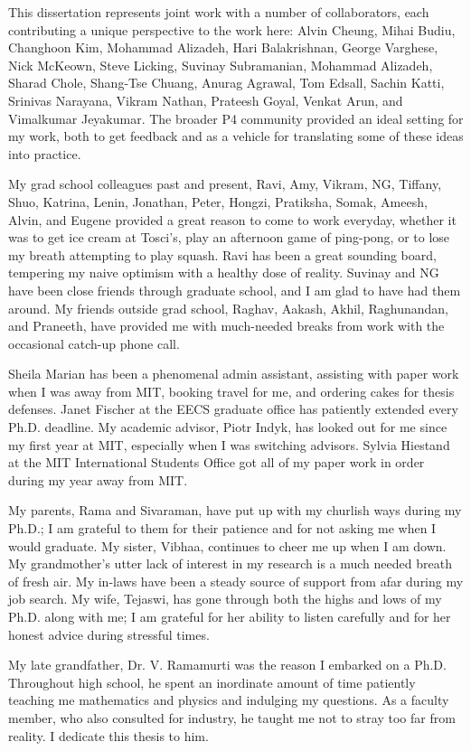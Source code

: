 This dissertation represents joint work with a number of collaborators, each
contributing a unique perspective to the work here: Alvin Cheung, Mihai Budiu,
Changhoon Kim, Mohammad Alizadeh, Hari Balakrishnan, George Varghese, Nick
McKeown, Steve Licking, Suvinay Subramanian, Mohammad Alizadeh, Sharad Chole,
Shang-Tse Chuang, Anurag Agrawal, Tom Edsall, Sachin Katti, Srinivas Narayana,
Vikram Nathan, Prateesh Goyal, Venkat Arun, and Vimalkumar Jeyakumar. The
broader P4 community provided an ideal setting for my work, both to get
feedback and as a vehicle for translating some of these ideas into practice. 

My grad school colleagues past and present, Ravi, Amy, Vikram, NG, Tiffany,
Shuo, Katrina, Lenin, Jonathan, Peter, Hongzi, Pratiksha, Somak, Ameesh, Alvin,
and Eugene provided a great reason to come to work everyday, whether it was to
get ice cream at Tosci's, play an afternoon game of ping-pong, or to lose my
breath attempting to play squash. Ravi has been a great sounding board,
tempering my naive optimism with a healthy dose of reality. Suvinay and NG have
been close friends through graduate school, and I am glad to have had them
around. My friends outside grad school, Raghav, Aakash, Akhil, Raghunandan, and
Praneeth, have provided me with much-needed breaks from work with the
occasional catch-up phone call.

Sheila Marian has been a phenomenal admin assistant, assisting with paper work
when I was away from MIT, booking travel for me, and ordering cakes for thesis
defenses. Janet Fischer at the EECS graduate office has patiently extended
every Ph.D.  deadline. My academic advisor, Piotr Indyk, has looked out for me
since my first year at MIT, especially when I was switching advisors.  Sylvia
Hiestand at the MIT International Students Office got all of my paper work in
order during my year away from MIT.

My parents, Rama and Sivaraman, have put up with my churlish ways during my
Ph.D.; I am grateful to them for their patience and for not asking me when I
would graduate. My sister, Vibhaa, continues to cheer me up when I am down.  My
grandmother's utter lack of interest in my research is a much needed breath of
fresh air. My in-laws have been a steady source of support from afar during my
job search. My wife, Tejaswi, has gone through both the highs and lows of my
Ph.D. along with me; I am grateful for her ability to listen carefully and for
her honest advice during stressful times. 

My late grandfather, Dr. V. Ramamurti was the reason I embarked on a Ph.D.
Throughout high school, he spent an inordinate amount of time patiently
teaching me mathematics and physics and indulging my questions. As a faculty
member, who also consulted for industry, he taught me not to stray too far from
reality. I dedicate this thesis to him.

